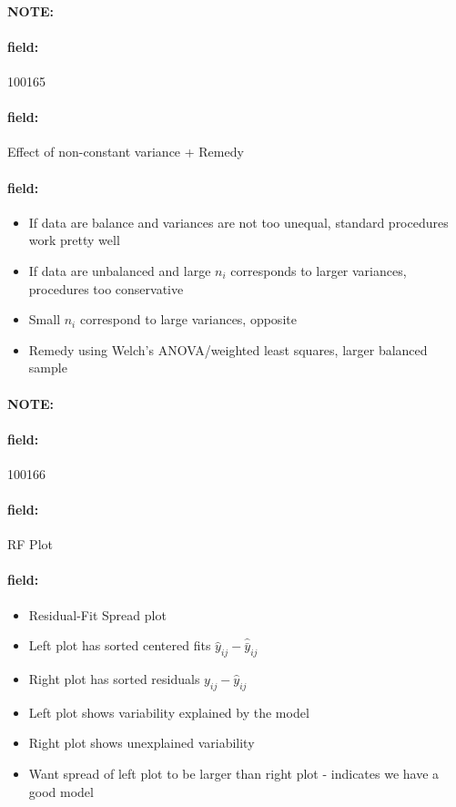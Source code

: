 \documentclass[12pt]{article}
\newenvironment{note}{\paragraph{NOTE:}}{}
\newenvironment{field}{\paragraph{field:}}{}
\begin{document}
\begin{note}
 \begin{field}
  \tiny 100165
 \end{field}
 \begin{field}
  Effect of non-constant variance + Remedy
 \end{field}
 \begin{field}
  \begin{itemize}
   \item If data are balance and variances are not too unequal, standard procedures work pretty well
   \item If data are unbalanced and large $n_i$ corresponds to larger variances, procedures too conservative
   \item Small $n_i$ correspond to large variances, opposite
   \item Remedy using Welch's ANOVA/weighted least squares, larger balanced sample
  \end{itemize}
 \end{field}
\end{note}


\begin{note}
 \begin{field}
  \tiny 100166
 \end{field}
 \begin{field}
  RF Plot
 \end{field}
 \begin{field}
  \begin{itemize}
   \item Residual-Fit Spread plot
   \item Left plot has sorted centered fits $\hat{y}_{ij} - \hat{\bar{y}}_{ij}$
   \item Right plot has sorted residuals $y_{ij} - \hat{y}_{ij}$
   \item Left plot shows variability explained by the model
   \item Right plot shows unexplained variability
   \item Want spread of left plot to be larger than right plot - indicates we have a good model
  \end{itemize}
 \end{field}
\end{note}
\end{document}
